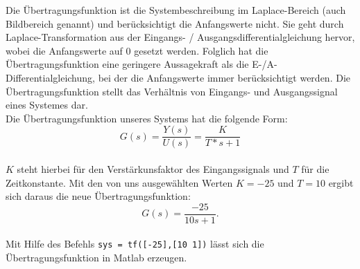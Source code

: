 Die Übertragungsfunktion ist die Systembeschreibung im Laplace-Bereich (auch Bildbereich genannt) und berücksichtigt die Anfangswerte nicht. Sie geht durch Laplace-Transformation aus der Eingangs- / Ausgangsdifferentialgleichung hervor, wobei die Anfangswerte auf 0 gesetzt werden. Folglich hat die Übertragungsfunktion eine geringere Aussagekraft als die E-/A-Differentialgleichung, bei der die Anfangswerte immer berücksichtigt werden. Die Übertragungsfunktion stellt das Verhältnis von Eingangs- und Ausgangssignal eines Systemes dar.\\
Die Übertragungsfunktion unseres Systems hat die folgende Form:
\begin{equation*}
    G(s)=\frac{Y(s)}{U(s)}=\frac{K}{T*s+1}
\end{equation*}\\
$K$ steht hierbei für den Verstärkunsfaktor des Eingangssignals und $T$ für die Zeitkonstante.
Mit den von uns ausgewählten Werten $K=-25$ und $T=10$ ergibt sich daraus die neue Übertragungsfunktion:
\begin{equation*}
    G(s)=\frac{-25}{10s+1} .
\end{equation*}\\
Mit Hilfe des Befehls \texttt{sys = tf([-25],[10 1])} lässt sich die Übertragungsfunktion in Matlab erzeugen.